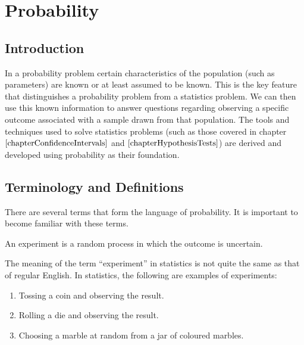 \chapter{Probability}
\label{sec.inverse} \pagestyle{myheadings}

\section{Introduction}

In a probability problem certain characteristics of the population 
(such as parameters) are known or at least assumed to be known. This is the key feature that distinguishes a probability problem
from a statistics problem. We can then use this known information to answer questions regarding observing a specific outcome associated with a sample drawn from that population. 
The tools and techniques used to solve statistics problems 
(such as those covered in chapter $\ref{chapterConfidenceIntervals}$
and $\ref{chapterHypothesisTests}$) 
are derived and developed using probability as their foundation.


\section{Terminology and Definitions}

There are several terms that form the language of probability. It is important to become familiar with these terms.

\begin{definition}[Experiment]	
An experiment is a random process in which the outcome is uncertain.
\end{definition}

\noindent
The meaning of the term ``experiment'' in statistics is not quite the same as that of regular English.
In statistics, the following are examples of experiments:

\begin{enumerate}
	\item	Tossing a coin and observing the result.
	\item	Rolling a die and observing the result.
	\item	Choosing a marble at random from a jar of coloured marbles.
\end{enumerate}

